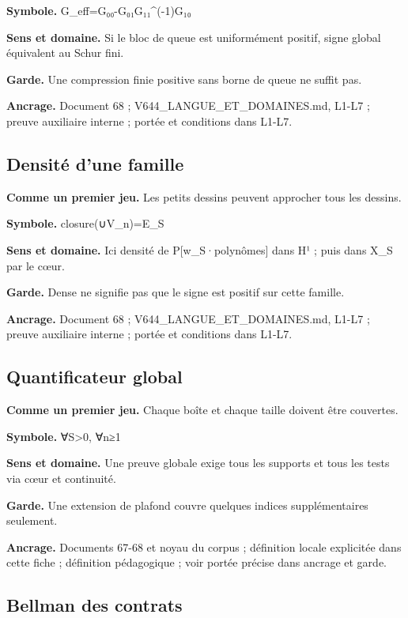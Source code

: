 \documentclass[
  9pt,
  a4paper,
]{article}
\begin{document}
\textbf{Symbole.} G\_eff=G₀₀-G₀₁G₁₁\^{}(-1)G₁₀

\textbf{Sens et domaine.} Si le bloc de queue est uniformément positif,
signe global équivalent au Schur fini.

\textbf{Garde.} Une compression finie positive sans borne de queue ne
suffit pas.

\textbf{Ancrage.} Document 68 ; V644\_LANGUE\_ET\_DOMAINES.md, L1-L7 ;
preuve auxiliaire interne ; portée et conditions dans L1-L7.

\hypertarget{densituxe9-dune-famille}{%
\subsection{Densité d'une famille}\label{densituxe9-dune-famille}}

\textbf{Comme un premier jeu.} Les petits dessins peuvent approcher tous
les dessins.

\textbf{Symbole.} closure(∪V\_n)=E\_S

\textbf{Sens et domaine.} Ici densité de P{[}w\_S·polynômes{]} dans H¹ ;
puis dans X\_S par le cœur.

\textbf{Garde.} Dense ne signifie pas que le signe est positif sur cette
famille.

\textbf{Ancrage.} Document 68 ; V644\_LANGUE\_ET\_DOMAINES.md, L1-L7 ;
preuve auxiliaire interne ; portée et conditions dans L1-L7.

\hypertarget{quantificateur-global}{%
\subsection{Quantificateur global}\label{quantificateur-global}}

\textbf{Comme un premier jeu.} Chaque boîte et chaque taille doivent
être couvertes.

\textbf{Symbole.} ∀S\textgreater0, ∀n≥1

\textbf{Sens et domaine.} Une preuve globale exige tous les supports et
tous les tests via cœur et continuité.

\textbf{Garde.} Une extension de plafond couvre quelques indices
supplémentaires seulement.

\textbf{Ancrage.} Documents 67-68 et noyau du corpus ; définition locale
explicitée dans cette fiche ; définition pédagogique ; voir portée
précise dans ancrage et garde.

\hypertarget{bellman-des-contrats}{%
\subsection{Bellman des contrats}\label{bellman-des-contrats}}
\end{document}
